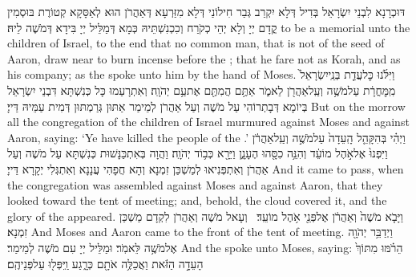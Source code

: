 {דּוּכְרָנָא לִבְנֵי יִשְׂרָאֵל בְּדִיל דְּלָא יִקְרַב גְּבַר חִילוֹנַי דְּלָא מִזַּרְעָא דְּאַהֲרֹן הוּא לְאַסָּקָא קְטוֹרֶת בּוּסְמִין קֳדָם יְיָ וְלָא יְהֵי כְקֹרַח וְכִכְנִשְׁתֵּיהּ כְּמָא דְּמַלֵּיל יְיָ בִּידָא דְּמֹשֶׁה לֵיהּ׃}
{to be a memorial unto the children of Israel, to the end that no common man, that is not of the seed of Aaron, draw near to burn incense before the \lord; that he fare not as Korah, and as his company; as the \lord\space spoke unto him by the hand of Moses.}{}
{וַיִּלֹּ֜נוּ כׇּל\maqqaf עֲדַ֤ת בְּנֵֽי\maqqaf יִשְׂרָאֵל֙ מִֽמׇּחֳרָ֔ת עַל\maqqaf מֹשֶׁ֥ה וְעַֽל\maqqaf אַהֲרֹ֖ן לֵאמֹ֑ר אַתֶּ֥ם הֲמִתֶּ֖ם אֶת\maqqaf עַ֥ם יְהֹוָֽה׃}
{וְאִתְרָעַמוּ כָּל כְּנִשְׁתָּא דִּבְנֵי יִשְׂרָאֵל בְּיוֹמָא דְּבָתְרוֹהִי עַל מֹשֶׁה וְעַל אַהֲרֹן לְמֵימַר אַתּוּן גְּרַמְתּוּן דְּמִית עַמֵּיהּ דַּייָ׃}
{But on the morrow all the congregation of the children of Israel murmured against Moses and against Aaron, saying: ‘Ye have killed the people of the \lord.’}{}
{וַיְהִ֗י בְּהִקָּהֵ֤ל הָֽעֵדָה֙ עַל\maqqaf מֹשֶׁ֣ה וְעַֽל\maqqaf אַהֲרֹ֔ן וַיִּפְנוּ֙ אֶל\maqqaf אֹ֣הֶל מוֹעֵ֔ד וְהִנֵּ֥ה כִסָּ֖הוּ הֶעָנָ֑ן וַיֵּרָ֖א כְּב֥וֹד יְהֹוָֽה׃}
{וַהֲוָה בְּאִתְכַּנָּשׁוּת כְּנִשְׁתָּא עַל מֹשֶׁה וְעַל אַהֲרֹן וְאִתְפְּנִיאוּ לְמַשְׁכַּן זִמְנָא וְהָא חֲפָהִי עֲנָנָא וְאִתְגְּלִי יְקָרָא דַּייָ׃}
{And it came to pass, when the congregation was assembled against Moses and against Aaron, that they looked toward the tent of meeting; and, behold, the cloud covered it, and the glory of the \lord\space appeared.}{}
{וַיָּבֹ֤א מֹשֶׁה֙ וְאַהֲרֹ֔ן אֶל\maqqaf פְּנֵ֖י אֹ֥הֶל מוֹעֵֽד׃ \setuma }
{וְעָאל מֹשֶׁה וְאַהֲרֹן לִקְדָם מַשְׁכַּן זִמְנָא׃}
{And Moses and Aaron came to the front of the tent of meeting.}{}
{וַיְדַבֵּ֥ר יְהֹוָ֖ה אֶל\maqqaf מֹשֶׁ֥ה לֵּאמֹֽר׃}
{וּמַלֵּיל יְיָ עִם מֹשֶׁה לְמֵימַר׃}
{And the \lord\space spoke unto Moses, saying:}{}
{הֵרֹ֗מּוּ מִתּוֹךְ֙ הָעֵדָ֣ה הַזֹּ֔את וַאֲכַלֶּ֥ה אֹתָ֖ם כְּרָ֑גַע וַֽיִּפְּל֖וּ עַל\maqqaf פְּנֵיהֶֽם׃}

